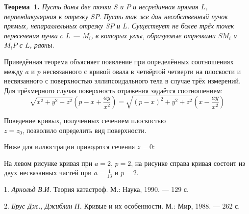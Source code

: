 \textbf{Теорема~1.} {\it Пусть даны две точки $S$ и $P$ и несрединная прямая $L$, перпендикулярная к отрезку $SP$. Пусть так же дан несобственный пучок прямых, непараллельных отрезку $SP$ и $L$. Существует не более трёх точек пересечения пучка с $L$ --- $M_i$, в которых углы, образуемые отрезками $SM_i$ и $M_iP$ с $L$, равны.}

Приведённая теорема объясняет появление при определённых соотношениях между $a$ и $p$ несвязанного с кривой овала в четвёртой четверти на плоскости и несвязанного с поверхностью эллипсоидального тела в случае трёх измерений. Для трёхмерного случая поверхность отражения задаётся соотношением:
\[
\sqrt{x^2+y^2+z^2}
\left( p-x+ \frac{ay}{x^2} \right)
=
\sqrt{{(p-x)}^2+y^2+z^2}
\left( x - \frac{ay}{x^2} \right)
\]

Поведение кривых, полученных сечением плоскостью \\
$z=z_0$, позволило определить вид поверхности.

Ниже для иллюстрации приводятся сечения $z=0$:

\begin{figure}[h]
\begin{minipage}[h]{0.49\linewidth}
\end{minipage}
\hfill
\begin{minipage}[h]{0.49\linewidth}
\end{minipage}
\label{ris:image1}
\end{figure}

На левом рисунке кривая при $a=2$, $p=2$, на рисунке справа кривая состоит из двух несвязанных частей  при $a=\frac{1}{13}$ и $p=2$.

\litlist

1. {\it Арнольд В.И.} Теория катастроф. М.: Наука, 1990. — 129 с.

2. {\it Брус Дж., Джиблин П.} Кривые и их особенности. М.: Мир, 1988. — 262 с.
